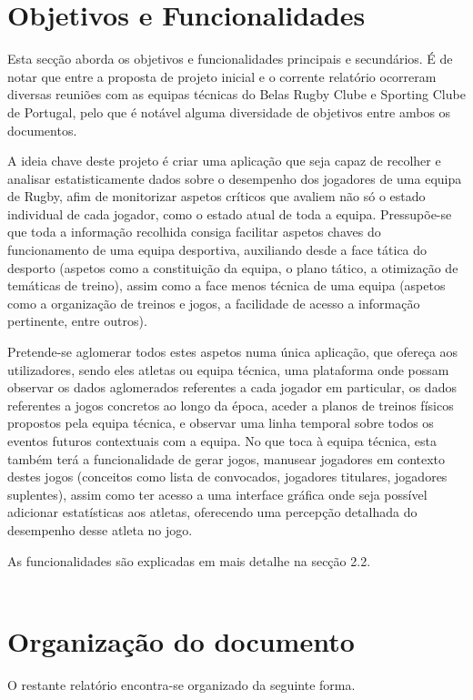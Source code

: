 
%
%
\section{Objetivos e Funcionalidades}\label{sec12} 

Esta secção aborda os objetivos e funcionalidades principais e secundários. É de notar que entre a proposta de projeto inicial e o corrente relatório ocorreram diversas reuniões com as equipas técnicas do Belas Rugby Clube e Sporting Clube de Portugal, pelo que é notável alguma diversidade de objetivos entre ambos os documentos.

A ideia chave deste projeto é criar uma aplicação que seja capaz de recolher e analisar estatisticamente dados sobre o desempenho dos jogadores de uma equipa de Rugby, afim de monitorizar aspetos críticos que avaliem não só o estado individual de cada jogador, como o estado atual de toda a equipa. Pressupõe-se que toda a informação recolhida consiga facilitar aspetos chaves do funcionamento de uma equipa desportiva, auxiliando desde a face tática do desporto (aspetos como a constituição da equipa, o plano tático, a otimização de temáticas de treino), assim como a face menos técnica de uma equipa (aspetos como a organização de treinos e jogos, a facilidade de acesso a informação pertinente, entre outros).

Pretende-se aglomerar todos estes aspetos numa única aplicação, que ofereça aos utilizadores, sendo eles atletas ou equipa técnica, uma plataforma onde possam observar os dados aglomerados referentes a cada jogador em particular, os dados referentes a jogos concretos ao longo da época, aceder a planos de treinos físicos propostos pela equipa técnica, e observar uma linha temporal sobre todos os eventos futuros contextuais com a equipa. No que toca à equipa técnica, esta também terá a funcionalidade de gerar jogos, manusear jogadores em contexto destes jogos (conceitos como lista de convocados, jogadores titulares, jogadores suplentes), assim como ter acesso a uma interface gráfica onde seja possível adicionar estatísticas aos atletas, oferecendo uma percepção detalhada do desempenho desse atleta no jogo. 

As funcionalidades são explicadas em mais detalhe na secção 2.2.\\
\\

\section{Organização do documento} \label{sec13}
O restante relatório encontra-se organizado da seguinte forma.\\

